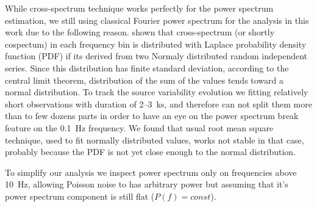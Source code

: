 \documentclass[a4paper,fleqn,usenatbib]{mnras}
\begin{document}
While cross-spectrum technique works perfectly for the power spectrum estimation, we still using classical Fourier power spectrum for the analysis in this work due to the following reason.
\citep{2017arXiv170909666H} shown that cross-spectrum (or shortly cospectum) in each frequency bin is distributed with Laplace probability density function (PDF) if its derived from two Normaly distributed random independent series.
Since this distribution has finite standard deviation, according to the central limit theorem, distribution of the sum of the values tends toward a normal distribution.
To track the source variability evolution we fitting relatively short observations with duration of 2--3~ks, and therefore can not split them more than to few dozens parts in order to have an eye on the power spectrum break feature on the 0.1~Hz frequency. 
We found that usual root mean square technique, used to fit normally distributed values, works not stable in that case, probably because the PDF is not yet close enough to the normal distribution. 

To simplify our analysis we inspect power spectrum only on frequencies above 10~Hz, allowing Poisson noise to has arbitrary power but assuming that it's power spectrum component is still flat ($P(f) = const$).
\end{document}

